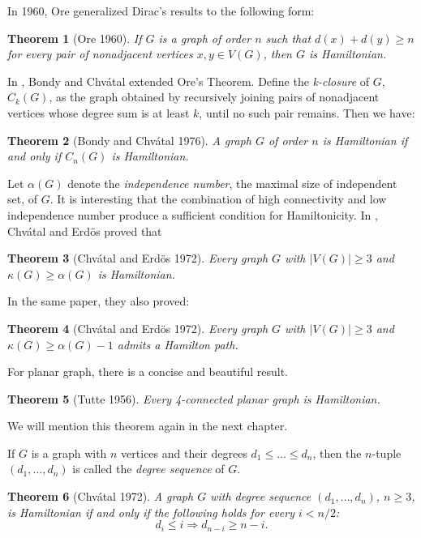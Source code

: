 \documentclass[12pt]{report}
\newtheorem{theorem}{Theorem}
\begin{document}
In 1960, Ore generalized Dirac's results to the following form:
\begin{theorem}[Ore 1960]\label{ore1960hth1}
If $G$ is a graph of order $n$ such that $d(x)+d(y)\ge n$ for every pair of nonadjacent vertices $x,y\in V(G)$, then $G$ is Hamiltonian.
\end{theorem}

In \cite{bondy1976a}, Bondy and Chv{\'a}tal extended Ore's Theorem. Define the {\em k-closure} of $G$, $C_k(G)$, as the graph obtained by recursively joining pairs of nonadjacent vertices whose degree sum is at least $k$, until no such pair remains. Then we have:
\begin{theorem}[Bondy and Chv{\'a}tal 1976]\label{thmcloham1}
A graph $G$ of order $n$ is Hamiltonian if and only if $C_n(G)$ is Hamiltonian.
\end{theorem}

Let $\alpha(G)$ denote the {\em independence number}, the maximal size of independent set, of $G$. It is interesting that the combination of high connectivity and low independence number produce a sufficient condition for Hamiltonicity. In \cite{chvatal1972a}, Chv{\'a}tal and Erd{\"o}s proved that
\begin{theorem}[Chv{\'a}tal and Erd{\"o}s 1972]\label{kageaptohathe}
Every graph $G$ with $|V(G)|\ge3$ and $\kappa(G)\ge\alpha(G)$ is Hamiltonian.
\end{theorem}
In the same paper, they also proved:
\begin{theorem}[Chv{\'a}tal and Erd{\"o}s 1972]
Every graph $G$ with $|V(G)|\ge3$ and $\kappa(G)\ge\alpha(G)-1$ admits a Hamilton path.
\end{theorem}

For planar graph, there is a concise and beautiful result.

\begin{theorem}[Tutte 1956]\label{thm4cpgih1}
Every 4-connected planar graph is Hamiltonian.
\end{theorem}
We will mention this theorem again in the next chapter.

If $G$ is a graph with $n$ vertices and their degrees $d_1\le\ldots\le d_n$, then the $n$-tuple $(d_1,\ldots,d_n)$ is called the {\em degree sequence} of $G$.
\begin{theorem}[Chv{\'a}tal 1972]
A graph $G$ with degree sequence $(d_1,\ldots,d_n)$, $n\ge3$, is Hamiltonian if and only if the following holds for every $i<n/2$:
$$d_i\le i\Rightarrow d_{n-i}\ge n-i.$$
\end{theorem}
\end{document}
